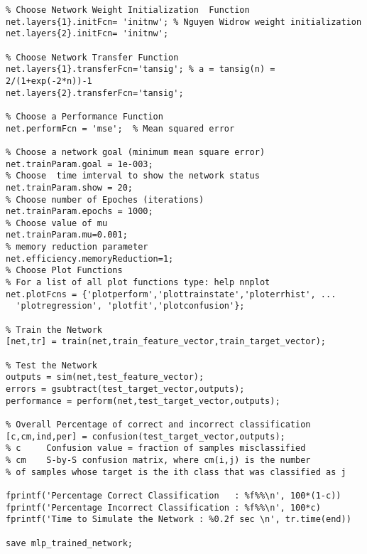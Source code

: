 \begin{lstlisting}
% Choose Network Weight Initialization  Function
net.layers{1}.initFcn= 'initnw'; % Nguyen Widrow weight initialization
net.layers{2}.initFcn= 'initnw';

% Choose Network Transfer Function
net.layers{1}.transferFcn='tansig'; % a = tansig(n) = 2/(1+exp(-2*n))-1
net.layers{2}.transferFcn='tansig';

% Choose a Performance Function
net.performFcn = 'mse';  % Mean squared error

% Choose a network goal (minimum mean square error)
net.trainParam.goal = 1e-003;
% Choose  time imterval to show the network status
net.trainParam.show = 20;
% Choose number of Epoches (iterations)
net.trainParam.epochs = 1000;
% Choose value of mu
net.trainParam.mu=0.001;
% memory reduction parameter
net.efficiency.memoryReduction=1;
% Choose Plot Functions
% For a list of all plot functions type: help nnplot
net.plotFcns = {'plotperform','plottrainstate','ploterrhist', ...
  'plotregression', 'plotfit','plotconfusion'};

% Train the Network
[net,tr] = train(net,train_feature_vector,train_target_vector);

% Test the Network
outputs = sim(net,test_feature_vector);
errors = gsubtract(test_target_vector,outputs);
performance = perform(net,test_target_vector,outputs);

% Overall Percentage of correct and incorrect classification
[c,cm,ind,per] = confusion(test_target_vector,outputs);
% c     Confusion value = fraction of samples misclassified
% cm	S-by-S confusion matrix, where cm(i,j) is the number 
% of samples whose target is the ith class that was classified as j

fprintf('Percentage Correct Classification   : %f%%\n', 100*(1-c))
fprintf('Percentage Incorrect Classification : %f%%\n', 100*c)
fprintf('Time to Simulate the Network : %0.2f sec \n', tr.time(end))

save mlp_trained_network;
\end{lstlisting}

